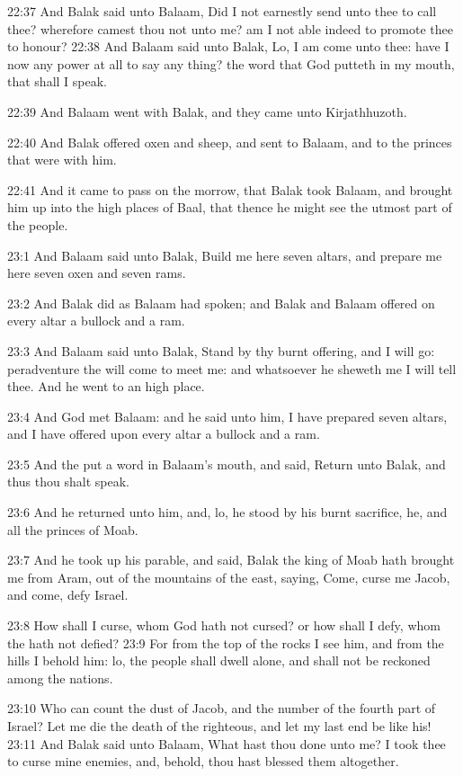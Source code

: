 22:37 And Balak said unto Balaam, Did I not earnestly send unto thee
to call thee? wherefore camest thou not unto me? am I not able indeed
to promote thee to honour?  22:38 And Balaam said unto Balak, Lo, I am
come unto thee: have I now any power at all to say any thing? the word
that God putteth in my mouth, that shall I speak.

22:39 And Balaam went with Balak, and they came unto Kirjathhuzoth.

22:40 And Balak offered oxen and sheep, and sent to Balaam, and to the
princes that were with him.

22:41 And it came to pass on the morrow, that Balak took Balaam, and
brought him up into the high places of Baal, that thence he might see
the utmost part of the people.

23:1 And Balaam said unto Balak, Build me here seven altars, and
prepare me here seven oxen and seven rams.

23:2 And Balak did as Balaam had spoken; and Balak and Balaam offered
on every altar a bullock and a ram.

23:3 And Balaam said unto Balak, Stand by thy burnt offering, and I
will go: peradventure the \LORD will come to meet me: and whatsoever he
sheweth me I will tell thee. And he went to an high place.

23:4 And God met Balaam: and he said unto him, I have prepared seven
altars, and I have offered upon every altar a bullock and a ram.

23:5 And the \LORD put a word in Balaam's mouth, and said, Return unto
Balak, and thus thou shalt speak.

23:6 And he returned unto him, and, lo, he stood by his burnt
sacrifice, he, and all the princes of Moab.

23:7 And he took up his parable, and said, Balak the king of Moab hath
brought me from Aram, out of the mountains of the east, saying, Come,
curse me Jacob, and come, defy Israel.

23:8 How shall I curse, whom God hath not cursed? or how shall I defy,
whom the \LORD hath not defied?  23:9 For from the top of the rocks I
see him, and from the hills I behold him: lo, the people shall dwell
alone, and shall not be reckoned among the nations.

23:10 Who can count the dust of Jacob, and the number of the fourth
part of Israel? Let me die the death of the righteous, and let my last
end be like his!  23:11 And Balak said unto Balaam, What hast thou
done unto me? I took thee to curse mine enemies, and, behold, thou
hast blessed them altogether.

